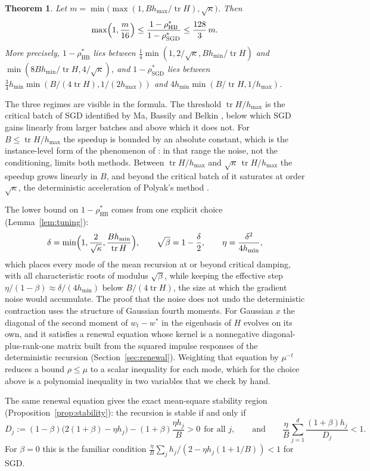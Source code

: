 \documentclass[11pt]{amsart}
\newtheorem{theorem}{Theorem}[section]
\theoremstyle{definition}
\theoremstyle{remark}
\numberwithin{equation}{section}
\newcommand{\tr}{\operatorname{tr}}
\newcommand{\hmax}{h_{\max}}
\newcommand{\hmin}{h_{\min}}
\begin{document}
\begin{theorem}\label{thm:main}
Let $m=\min\bigl(\max(1,B\hmax/\tr H),\sqrt\kappa\bigr)$. Then
\[
\max\Bigl(1,\frac{m}{16}\Bigr)\le\frac{1-\rho_{\mathrm{HB}}^*}{1-\rho_{\mathrm{SGD}}^*}\le\frac{128}{3}\,m .
\]
More precisely, $1-\rho_{\mathrm{HB}}^*$ lies between $\frac14\min(1,2/\sqrt\kappa,B\hmin/\tr H)$ and $\min(8B\hmin/\tr H,4/\sqrt\kappa)$, and $1-\rho_{\mathrm{SGD}}^*$ lies between $\frac34\hmin\min(B/(4\tr H),1/(2\hmax))$ and $4\hmin\min(B/\tr H,1/\hmax)$.
\end{theorem}

The three regimes are visible in the formula. The threshold $\tr H/\hmax$ is the critical batch of SGD identified by Ma, Bassily and Belkin \cite{MBB18}, below which SGD gains linearly from larger batches and above which it does not. For $B\le\tr H/\hmax$ the speedup is bounded by an absolute constant, which is the instance-level form of the phenomenon of \cite{KNJK18}: in that range the noise, not the conditioning, limits both methods. Between $\tr H/\hmax$ and $\sqrt\kappa\,\tr H/\hmax$ the speedup grows linearly in $B$, and beyond the critical batch of \cite{MMNK26} it saturates at order $\sqrt\kappa$, the deterministic acceleration of Polyak's method \cite{Pol64}.

The lower bound on $1-\rho^*_{\mathrm{HB}}$ comes from one explicit choice (Lemma~\ref{lem:tuning}):
\[
\delta=\min\Bigl(1,\frac{2}{\sqrt\kappa},\frac{B\hmin}{\tr H}\Bigr),\qquad \sqrt\beta=1-\frac\delta2,\qquad \eta=\frac{\delta^2}{4\hmin},
\]
which places every mode of the mean recursion at or beyond critical damping, with all characteristic roots of modulus $\sqrt\beta$, while keeping the effective step $\eta/(1-\beta)\approx\delta/(4\hmin)$ below $B/(4\tr H)$, the size at which the gradient noise would accumulate. The proof that the noise does not undo the deterministic contraction uses the structure of Gaussian fourth moments. For Gaussian $x$ the diagonal of the second moment of $w_t-w^*$ in the eigenbasis of $H$ evolves on its own, and it satisfies a renewal equation whose kernel is a nonnegative diagonal-plus-rank-one matrix built from the squared impulse responses of the deterministic recursion (Section~\ref{sec:renewal}). Weighting that equation by $\mu^{-t}$ reduces a bound $\rho\le\mu$ to a scalar inequality for each mode, which for the choice above is a polynomial inequality in two variables that we check by hand.

The same renewal equation gives the exact mean-square stability region (Proposition~\ref{prop:stability}): the recursion is stable if and only if
\[
D_j:=(1-\beta)\bigl(2(1+\beta)-\eta h_j\bigr)-(1+\beta)\frac{\eta h_j}{B}>0\ \ \text{for all } j,
\qquad\text{and}\qquad
\frac\eta B\sum_{j=1}^d\frac{(1+\beta)h_j}{D_j}<1 .
\]
For $\beta=0$ this is the familiar condition $\frac\eta B\sum_j h_j/(2-\eta h_j(1+1/B))<1$ for SGD.
\end{document}
